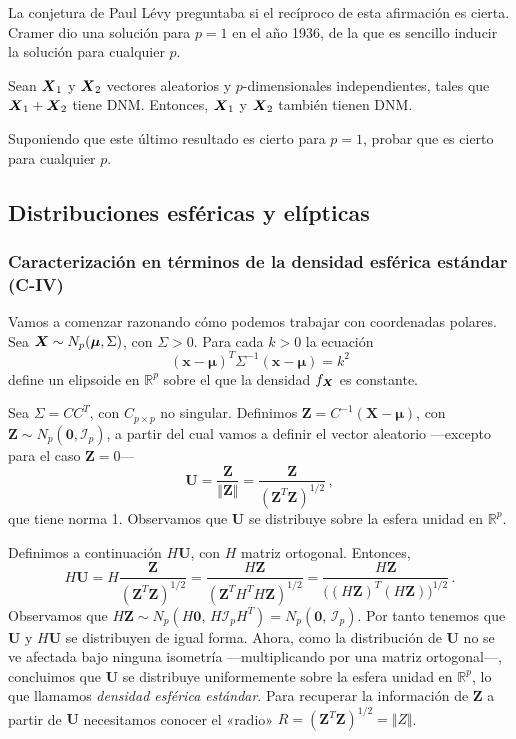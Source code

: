 La conjetura de Paul Lévy preguntaba si el recíproco de esta afirmación es cierta. Cramer dio una solución para $p=1$ en el año 1936, de la que es sencillo inducir la solución para cualquier $p$. 

\begin{nth}
  Sean $\boldsymbol{X}_1$ y $\boldsymbol{X}_2$ vectores aleatorios y $p$-dimensionales independientes, tales que $\boldsymbol{X}_1 + \boldsymbol{X}_2$ tiene DNM. Entonces, $\boldsymbol{X}_1$ y $\boldsymbol{X}_2$ también tienen DNM.
\end{nth}

\begin{ejer}
  Suponiendo que este último resultado es cierto para $p=1$, probar que es cierto para cualquier $p$.
\end{ejer}

\subsection{Distribuciones esféricas y elípticas}

\subsubsection{Caracterización en términos de la densidad esférica estándar (C-IV)}

Vamos a comenzar razonando cómo podemos trabajar con coordenadas polares. Sea $\boldsymbol{X} \sim N_p(\boldsymbol \mu, \Sigma)$, con $\Sigma > 0$. Para cada $k > 0$ la ecuación \[(\boldsymbol x - \boldsymbol \mu)^T \Sigma^{-1}(\boldsymbol x - \boldsymbol \mu) = k^2\] define un elipsoide en $\mathbb R^p$ sobre el que la densidad $f_{\boldsymbol{X}}$ es constante. 

Sea $\Sigma = CC^T$, con $C_{p\times p}$ no singular. Definimos $\boldsymbol Z = C^{-1}(\boldsymbol X - \boldsymbol \mu)$, con $\boldsymbol Z \sim N_p(\boldsymbol 0, \mathcal I_p)$, a partir del cual vamos a definir el vector aleatorio —excepto para el caso $\boldsymbol Z = 0$— \[\boldsymbol U = \frac{\boldsymbol Z}{\Vert \boldsymbol Z \Vert} = \frac{\boldsymbol Z}{(\boldsymbol Z^T \boldsymbol Z)^{1/2}}\,,\] que tiene norma 1. Observamos que $\boldsymbol U$ se distribuye sobre la esfera unidad en $\mathbb R^p$.

Definimos a continuación $H \boldsymbol U$, con $H$ matriz ortogonal. Entonces, \[
  H \boldsymbol U = H \frac{\boldsymbol Z}{\left(\boldsymbol Z^T \boldsymbol Z\right)^{1/2}} = \frac{H\boldsymbol Z}{\left(\boldsymbol Z^T H^T H\boldsymbol Z\right)^{1/2}} = \frac{H\boldsymbol Z}{\Big((H\boldsymbol Z)^T (H\boldsymbol Z)\Big)^{1/2}}\,.
\] Observamos que $H \boldsymbol Z \sim N_p(H \boldsymbol 0,\, H \mathcal I_pH^T) = N_p(\boldsymbol 0,\, \mathcal I_p)$. Por tanto tenemos que $\boldsymbol U$ y $H \boldsymbol U$ se distribuyen de igual forma. Ahora, como la distribución de $\boldsymbol U$ no se ve afectada bajo ninguna isometría —multiplicando por una matriz ortogonal—, concluimos que $\boldsymbol U$ se distribuye uniformemente sobre la esfera unidad en $\mathbb R^p$, lo que llamamos \textit{densidad esférica estándar}. Para recuperar la información de $\boldsymbol Z$ a partir de $\boldsymbol U$ necesitamos conocer el «radio» $R = (\boldsymbol Z^T \boldsymbol Z)^{1/2} = \Vert Z \Vert$.

